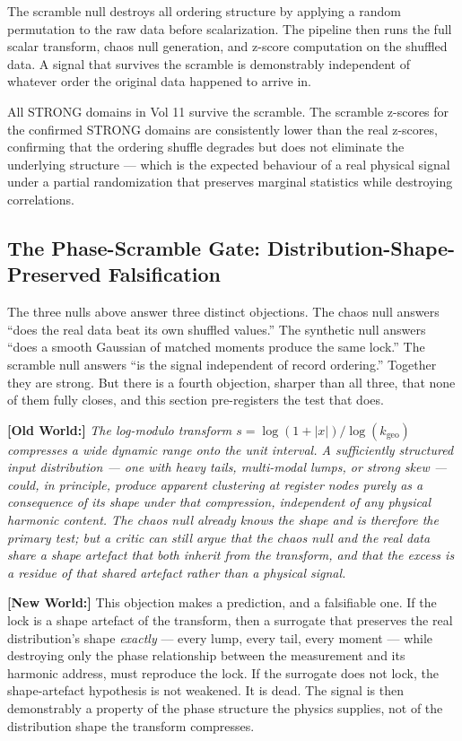 \documentclass[11pt, letterpaper, openany]{book}
\newcommand{\oldworld}[1]{\noindent\textbf{\color{goldseal}[Old World:]} \textit{#1}\medskip}
\newcommand{\newworld}[1]{\noindent\textbf{\color{kishblue}[New World:]} #1\medskip}
\begin{document}
The scramble null destroys all ordering structure by applying a random
permutation to the raw data before scalarization. The pipeline then runs
the full scalar transform, chaos null generation, and z-score computation
on the shuffled data. A signal that survives the scramble is demonstrably
independent of whatever order the original data happened to arrive in.

All STRONG domains in Vol 11 survive the scramble. The scramble z-scores
for the confirmed STRONG domains are consistently lower than the real z-scores,
confirming that the ordering shuffle degrades but does not eliminate the
underlying structure --- which is the expected behaviour of a real physical
signal under a partial randomization that preserves marginal statistics
while destroying correlations.

\subsection*{The Phase-Scramble Gate: Distribution-Shape-Preserved Falsification}
 
The three nulls above answer three distinct objections. The chaos null answers
``does the real data beat its own shuffled values.'' The synthetic null answers
``does a smooth Gaussian of matched moments produce the same lock.'' The scramble
null answers ``is the signal independent of record ordering.'' Together they are
strong. But there is a fourth objection, sharper than all three, that none of them
fully closes, and this section pre-registers the test that does.
 
\oldworld{The log-modulo transform $s = \log(1+|x|)/\log(k_\text{geo})$ compresses
a wide dynamic range onto the unit interval. A sufficiently structured input
distribution --- one with heavy tails, multi-modal lumps, or strong skew --- could,
in principle, produce apparent clustering at register nodes purely as a consequence
of its \emph{shape} under that compression, independent of any physical harmonic
content. The chaos null already knows the shape and is therefore the primary test;
but a critic can still argue that the chaos null and the real data share a shape
artefact that both inherit from the transform, and that the excess is a residue of
that shared artefact rather than a physical signal.}
 
\newworld{This objection makes a prediction, and a falsifiable one. If the lock is
a shape artefact of the transform, then a surrogate that preserves the real
distribution's shape \emph{exactly} --- every lump, every tail, every moment --- while
destroying only the phase relationship between the measurement and its harmonic
address, must reproduce the lock. If the surrogate does not lock, the shape-artefact
hypothesis is not weakened. It is dead. The signal is then demonstrably a property of
the phase structure the physics supplies, not of the distribution shape the transform
compresses.}
 
\end{document}
